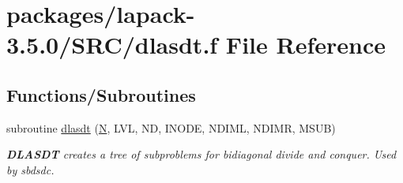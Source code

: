 \hypertarget{dlasdt_8f}{}\section{packages/lapack-\/3.5.0/\+S\+R\+C/dlasdt.f File Reference}
\label{dlasdt_8f}
\subsection*{Functions/\+Subroutines}
\begin{DoxyCompactItemize}
\item 
subroutine \hyperlink{group__auxOTHERauxiliary_gab7d5a1edccc56fb53970dd9607fcd5ee}{dlasdt} (\hyperlink{polmisc_8c_a0240ac851181b84ac374872dc5434ee4}{N}, L\+V\+L, N\+D, I\+N\+O\+D\+E, N\+D\+I\+M\+L, N\+D\+I\+M\+R, M\+S\+U\+B)
\begin{DoxyCompactList}\small\item\em {\bfseries D\+L\+A\+S\+D\+T} creates a tree of subproblems for bidiagonal divide and conquer. Used by sbdsdc. \end{DoxyCompactList}\end{DoxyCompactItemize}
